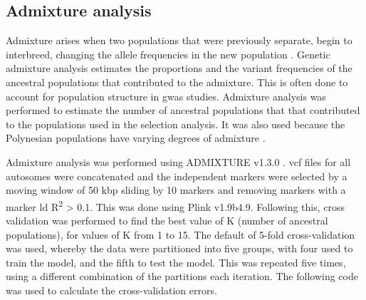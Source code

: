 \documentclass[twoside,openright]{report}
\begin{document}
\subsection{Admixture analysis}\label{admixture}

Admixture arises when two populations that were previously separate,
begin to interbreed, changing the allele frequencies in the new
population \citep{Pritchard2000}. Genetic admixture analysis estimates
the proportions and the variant frequencies of the ancestral populations
that contributed to the admixture. This is often done to account for
population structure in \gls{gwas} studies. Admixture analysis was
performed to estimate the number of ancestral populations that that
contributed to the populations used in the selection analysis. It was
also used because the Polynesian populations have varying degrees of
admixture \citep{Wollstein2010}.

Admixture analysis was performed using ADMIXTURE v1.3.0
\citep{Alexander2009}. \Gls{vcf} files for all autosomes were
concatenated and the independent markers were selected by a moving
window of 50 kbp sliding by 10 markers and removing markers with a
marker \gls{ld} R\textsuperscript{2} \textgreater{} 0.1. This was done
using Plink v1.9b4.9. Following this, cross validation was performed to
find the best value of K (number of ancestral populations), for values
of K from 1 to 15. The default of 5-fold cross-validation was used,
whereby the data were partitioned into five groups, with four used to
train the model, and the fifth to test the model. This was repeated five
times, using a different combination of the partitions each iteration.
The following code was used to calculate the cross-validation errors.
\end{document}
